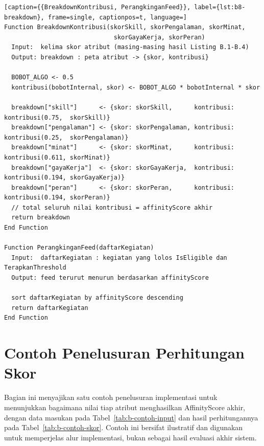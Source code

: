 \begin{minipage}{\textwidth}
\begin{lstlisting}[caption={{BreakdownKontribusi, PerangkinganFeed}}, label={lst:b8-breakdown}, frame=single, captionpos=t, language=]
Function BreakdownKontribusi(skorSkill, skorPengalaman, skorMinat,
                              skorGayaKerja, skorPeran)
  Input:  kelima skor atribut (masing-masing hasil Listing B.1-B.4)
  Output: breakdown : peta atribut -> {skor, kontribusi}

  BOBOT_ALGO <- 0.5
  kontribusi(bobotInternal, skor) <- BOBOT_ALGO * bobotInternal * skor

  breakdown["skill"]      <- {skor: skorSkill,      kontribusi: kontribusi(0.75,  skorSkill)}
  breakdown["pengalaman"] <- {skor: skorPengalaman, kontribusi: kontribusi(0.25,  skorPengalaman)}
  breakdown["minat"]      <- {skor: skorMinat,      kontribusi: kontribusi(0.611, skorMinat)}
  breakdown["gayaKerja"]  <- {skor: skorGayaKerja,  kontribusi: kontribusi(0.194, skorGayaKerja)}
  breakdown["peran"]      <- {skor: skorPeran,      kontribusi: kontribusi(0.194, skorPeran)}
  // total seluruh nilai kontribusi = affinityScore akhir
  return breakdown
End Function

Function PerangkinganFeed(daftarKegiatan)
  Input:  daftarKegiatan : kegiatan yang lolos IsEligible dan TerapkanThreshold
  Output: feed terurut menurun berdasarkan affinityScore

  sort daftarKegiatan by affinityScore descending
  return daftarKegiatan
End Function
\end{lstlisting}
\end{minipage}

\section{Contoh Penelusuran Perhitungan Skor}
\label{sec:b-contoh-penelusuran}

Bagian ini menyajikan satu contoh penelusuran implementasi untuk menunjukkan bagaimana nilai tiap atribut menghasilkan AffinityScore akhir, dengan data masukan pada Tabel~\ref{tab:b-contoh-input} dan hasil perhitungannya pada Tabel~\ref{tab:b-contoh-skor}. Contoh ini bersifat ilustratif dan digunakan untuk memperjelas alur implementasi, bukan sebagai hasil evaluasi akhir sistem.

